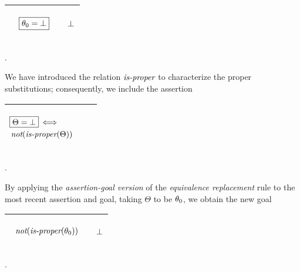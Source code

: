 \documentclass[runningheads]{llncs}
\DeclareMathOperator{\unot}{\emph{not}\kern-.0pt}
\DeclareMathOperator{\uiff}{\iff}
\begin{document}
\begin{center}
\begin{tabular}{|m{}|m{}||m{}|}
 \hline 
  & 
  \begin{center}
${\begin{aligned} 
&\begin{aligned}
 \boxed{\theta_{0} = \bot} \end{aligned}\end{aligned}}$\hspace{2cm} 
\end{center} & \begin{center}$\bot$ \end{center} \\
\hline
\end{tabular}.
\end{center}

We have introduced the relation $\emph{is-proper}$ to characterize the proper substitutions; consequently, we include the assertion 
\begin{center}
 \begin{tabular}{|m{}|m{}||m{}|}
 \hline 
 \begin{center}
 {\begin{align*}
 \begin{aligned}
 &\boxed{\Theta = \bot} \uiff \\ &\unot(\isprop(\Theta))
 \end{aligned}
\end{align*}}
\end{center} 
& & \\
\hline
\end{tabular}.
\end{center}

\noindent By applying the \emph{assertion-goal version} of the \emph{equivalence replacement} rule to the most recent assertion and goal, taking $\Theta$ to be $\theta_{0}$,
we obtain the new goal


\begin{center}
\begin{tabular}{|m{}|m{}||m{}|} 
 \hline 
  & 
  \begin{center}
$\begin{aligned} \hspace{-5pt}
&\begin{aligned}
\unot(\isprop(\thet{0}))
  \end{aligned}\end{aligned}$ 
\end{center} & \begin{center}$\bot$ \end{center} \\
\hline
\end{tabular}.
\end{center}
\end{document}
